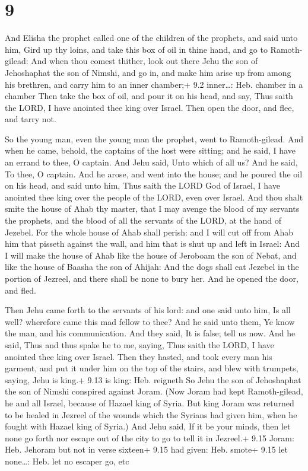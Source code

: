 \hypertarget{section-8}{%
\section{9}\label{section-8}}

 And Elisha the prophet called one of the children of the
prophets, and said unto him, Gird up thy loins, and take this box of oil
in thine hand, and go to Ramoth-gilead:  And when thou
comest thither, look out there Jehu the son of Jehoshaphat the son of
Nimshi, and go in, and make him arise up from among his brethren, and
carry him to an inner chamber;+ 9.2 inner\ldots: Heb. chamber in a
chamber  Then take the box of oil, and pour it on his head,
and say, Thus saith the LORD, I have anointed thee king over Israel.
Then open the door, and flee, and tarry not.

 So the young man, even the young man the prophet, went to
Ramoth-gilead.  And when he came, behold, the captains of
the host were sitting; and he said, I have an errand to thee, O captain.
And Jehu said, Unto which of all us? And he said, To thee, O captain.
 And he arose, and went into the house; and he poured the
oil on his head, and said unto him, Thus saith the LORD God of Israel, I
have anointed thee king over the people of the LORD, even over Israel.
 And thou shalt smite the house of Ahab thy master, that I
may avenge the blood of my servants the prophets, and the blood of all
the servants of the LORD, at the hand of Jezebel.  For the
whole house of Ahab shall perish: and I will cut off from Ahab him that
pisseth against the wall, and him that is shut up and left in Israel:
 And I will make the house of Ahab like the house of
Jeroboam the son of Nebat, and like the house of Baasha the son of
Ahijah:  And the dogs shall eat Jezebel in the portion of
Jezreel, and there shall be none to bury her. And he opened the door,
and fled.

 Then Jehu came forth to the servants of his lord: and
one said unto him, Is all well? wherefore came this mad fellow to thee?
And he said unto them, Ye know the man, and his communication.
 And they said, It is false; tell us now. And he said, Thus
and thus spake he to me, saying, Thus saith the LORD, I have anointed
thee king over Israel.  Then they hasted, and took every
man his garment, and put it under him on the top of the stairs, and blew
with trumpets, saying, Jehu is king.+ 9.13 is king: Heb. reigneth
 So Jehu the son of Jehoshaphat the son of Nimshi conspired
against Joram. (Now Joram had kept Ramoth-gilead, he and all Israel,
because of Hazael king of Syria.  But king Joram was
returned to be healed in Jezreel of the wounds which the Syrians had
given him, when he fought with Hazael king of Syria.) And Jehu said, If
it be your minds, then let none go forth nor escape out of the city to
go to tell it in Jezreel.+ 9.15 Joram: Heb. Jehoram but not in verse
sixteen+ 9.15 had given: Heb. smote+ 9.15 let none\ldots: Heb. let no
escaper go, etc

